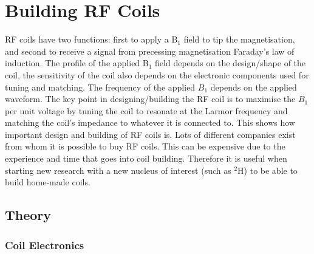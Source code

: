 \chapter{Building RF Coils}

\label{Chap:Coils}

\ac{RF} coils have two functions: first to apply a B$_1$ field to tip the magnetisation, and second to receive a signal from precessing magnetisation Faraday's law of induction. The profile of the applied B$_1$ field depends on the design/shape of the coil, the sensitivity of the coil also depends on the electronic components used for tuning and matching. The frequency of the applied $B_1$ depends on the applied waveform. The key point in designing/building the \ac{RF} coil is to maximise the $B_1$ per unit voltage by tuning the coil to resonate at the Larmor frequency and matching the coil's impedance to whatever it is connected to. This shows how important design and building of \ac{RF} coils is. Lots of different companies exist from whom it is possible to buy \ac{RF} coils. This can be expensive due to the experience and time that goes into coil building. Therefore it is useful when starting new research with a new nucleus of interest (such as $^2$H) to be able to build home-made coils. 


\section{Theory}

\subsection{Coil Electronics}



